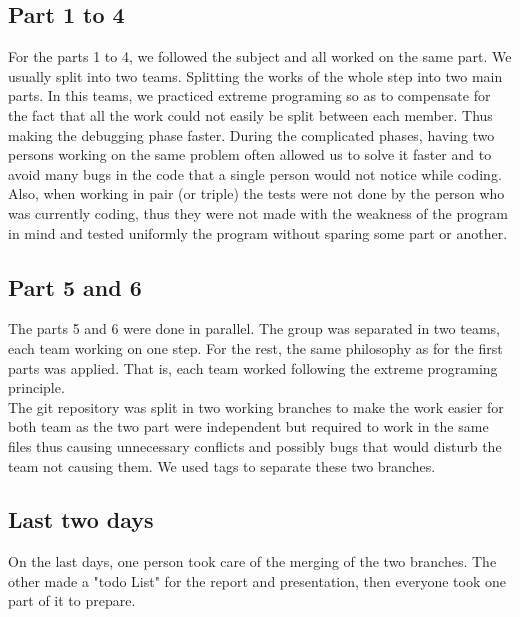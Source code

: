 \subsection{Part 1 to 4}

For the parts 1 to 4, we followed the subject and all worked on the same part. We usually split into two teams.
Splitting the works of the whole step into two main parts. In this teams, we practiced extreme programing so as to
compensate for the fact that all the work could not easily be split between each member. Thus making the debugging phase faster. During the complicated phases,
having two persons working on the same problem often allowed us to solve it faster and to avoid many bugs in the code
that a single person would not notice while coding.\\
Also, when working in pair (or triple) the tests were not done by the person who was currently coding, thus they 
were not made with the weakness of the program in mind and tested uniformly the program without sparing some part 
or another.

\subsection{Part 5 and 6}

The parts 5 and 6 were done in parallel. The group was separated in two teams, each team working on one step.
For the rest, the same philosophy as for the first parts was applied. That is, each team worked following the
extreme programing principle.\\
The git repository was split in two working branches to make the work easier for both team as the two part were
independent but required to work in the same files thus causing unnecessary conflicts and possibly bugs that would
disturb the team not causing them. We used tags to separate these two branches.

\subsection{Last two days}

On the last days, one person took care of the merging of the two branches. The other made a "todo List" for the report 
and presentation, then everyone took one part of it to prepare. 
